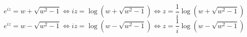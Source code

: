 \documentclass[a4paper,10pt]{article}
\begin{document}
\begin{equation}
 e^{iz} = w + \sqrt{w^2 - 1} \Leftrightarrow iz = \log (w + \sqrt{w^2 - 1}) \Leftrightarrow z = \frac{1}{i}\log (w + \sqrt{w^2 - 1})
\end{equation}
\begin{equation}
 e^{iz} = w - \sqrt{w^2 - 1} \Leftrightarrow iz = \log (w - \sqrt{w^2 - 1}) \Leftrightarrow z = \frac{1}{i}\log (w - \sqrt{w^2 - 1})
\end{equation}
\end{document}
